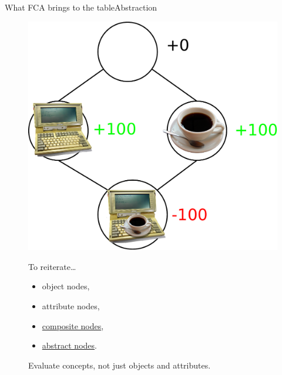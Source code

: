 \begin{frame}{What FCA brings to the table}{Abstraction}
\begin{figure}[ht]
\begin{minipage}[t]{0.55\linewidth}
\vspace{0pt}
\centering
\includegraphics[width=\textwidth]{img/introduction/fca_coffee.pdf}
\end{minipage}
\hfill
\begin{minipage}[t]{0.40\linewidth}
\vspace{0pt}
\begin{block}{To reiterate\ldots}
\begin{itemize}
\item object nodes,
\item attribute nodes,
\item \underline{composite nodes},
\item \underline{abstract nodes}.
\end{itemize}
\vspace{0.4cm}
Evaluate concepts, not just objects and attributes.
\end{block}
\end{minipage}
\end{figure}

\end{frame}



